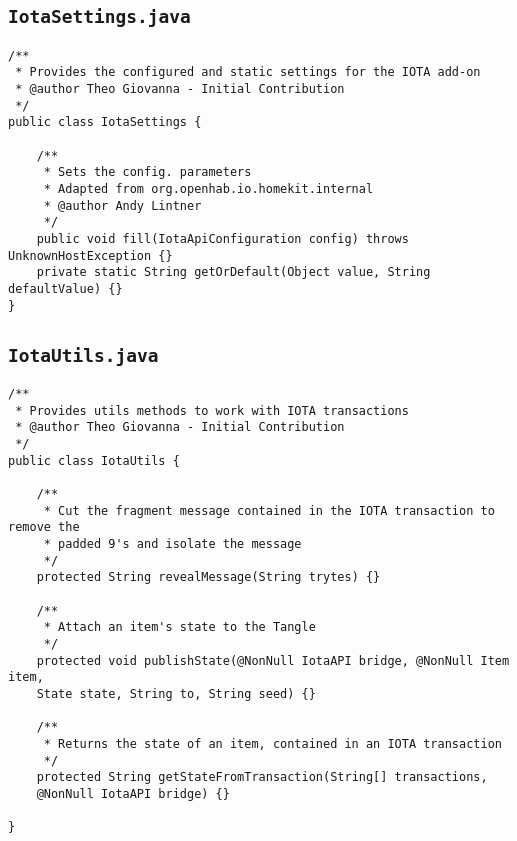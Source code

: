 \documentclass[a4paper,10pt]{article}
\begin{document}
\newpage 

\subsection{\texttt{IotaSettings.java}}

\begin{verbatim}
/**
 * Provides the configured and static settings for the IOTA add-on
 * @author Theo Giovanna - Initial Contribution
 */
public class IotaSettings {

	/**
	 * Sets the config. parameters
	 * Adapted from org.openhab.io.homekit.internal
	 * @author Andy Lintner
	 */
	public void fill(IotaApiConfiguration config) throws UnknownHostException {}
	private static String getOrDefault(Object value, String defaultValue) {}
}

\end{verbatim}

\subsection{\texttt{IotaUtils.java}}

\begin{verbatim}
/**
 * Provides utils methods to work with IOTA transactions
 * @author Theo Giovanna - Initial Contribution
 */
public class IotaUtils {

	/**
	 * Cut the fragment message contained in the IOTA transaction to remove the 
	 * padded 9's and isolate the message
	 */
	protected String revealMessage(String trytes) {}
	
	/**
	 * Attach an item's state to the Tangle
	 */
	protected void publishState(@NonNull IotaAPI bridge, @NonNull Item item, 
	State state, String to, String seed) {}
	
	/**
	 * Returns the state of an item, contained in an IOTA transaction
	 */
	protected String getStateFromTransaction(String[] transactions, 
	@NonNull IotaAPI bridge) {}

}
\end{verbatim}
\end{document}
